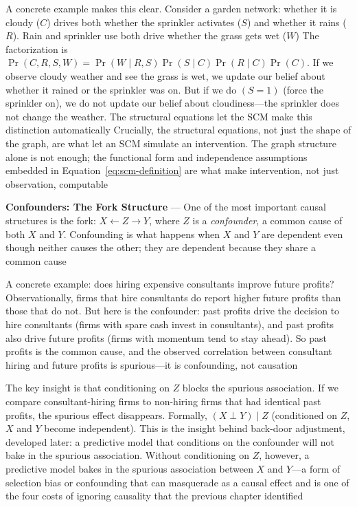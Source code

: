 A concrete example makes this clear. Consider a garden network: whether it is
cloudy ($C$) drives both whether the sprinkler activates ($S$) and whether it
rains ($R$). Rain and sprinkler use both drive whether the grass gets wet ($W$) The
factorization is $\Pr(C, R, S, W) = \Pr(W \mid R, S) \Pr(S \mid C) \Pr(R \mid C)
\Pr(C)$. If we observe cloudy weather and see the grass is wet, we update our belief
about whether it rained or the sprinkler was on. But if we do $(S = 1)$ (force the
sprinkler on), we do not update our belief about cloudiness—the sprinkler does not
change the weather. The structural equations let the SCM make this distinction
automatically Crucially, the structural equations, not just the shape of the
graph, are what let an SCM simulate an intervention. The graph structure alone
is not enough; the functional form and independence assumptions embedded in Equation~\eqref{eq:scm-definition}
are what make intervention, not just observation, computable


\textbf{Confounders: The Fork Structure} --- One of the most important causal structures
is the fork: $X \leftarrow Z \rightarrow Y$, where $Z$ is a \emph{confounder}, a
common cause of both $X$ and $Y$. Confounding is what happens when $X$ and $Y$
are dependent even though neither causes the other; they are dependent because they
share a common cause

A concrete example: does hiring expensive consultants improve future profits?
Observationally, firms that hire consultants do report higher future profits than
those that do not. But here is the confounder: past profits drive the decision to
hire consultants (firms with spare cash invest in consultants), and past profits
also drive future profits (firms with momentum tend to stay ahead). So past profits
is the common cause, and the observed correlation between consultant hiring and
future profits is spurious—it is confounding, not causation

The key insight is that conditioning on $Z$ blocks the spurious association. If we
compare consultant-hiring firms to non-hiring firms that had identical past profits,
the spurious effect disappears. Formally, $(X \perp Y) \mid Z$ (conditioned on $Z$,
$X$ and $Y$ become independent). This is the insight behind back-door adjustment,
developed later: a predictive model that conditions on the confounder will not
bake in the spurious association. Without conditioning on $Z$, however, a predictive
model bakes in the spurious association between $X$ and $Y$—a form of selection
bias or confounding that can masquerade as a causal effect and is one of the
four costs of ignoring causality that the previous chapter identified

